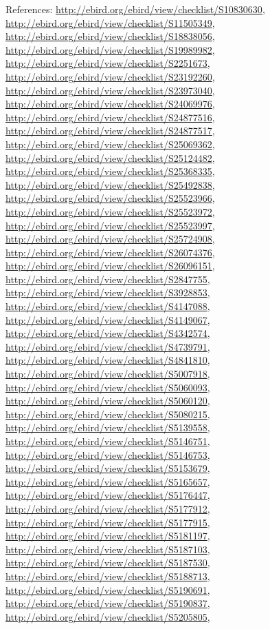 \documentclass[9pt, article]{memoir}
\begin{document}
\begin{multicols}{2}
\vspace{6pt}References: 
\url{http://ebird.org/ebird/view/checklist/S10830630}, 
\url{http://ebird.org/ebird/view/checklist/S11505349}, 
\url{http://ebird.org/ebird/view/checklist/S18838056}, 
\url{http://ebird.org/ebird/view/checklist/S19989982}, 
\url{http://ebird.org/ebird/view/checklist/S2251673}, 
\url{http://ebird.org/ebird/view/checklist/S23192260}, 
\url{http://ebird.org/ebird/view/checklist/S23973040}, 
\url{http://ebird.org/ebird/view/checklist/S24069976}, 
\url{http://ebird.org/ebird/view/checklist/S24877516}, 
\url{http://ebird.org/ebird/view/checklist/S24877517}, 
\url{http://ebird.org/ebird/view/checklist/S25069362}, 
\url{http://ebird.org/ebird/view/checklist/S25124482}, 
\url{http://ebird.org/ebird/view/checklist/S25368335}, 
\url{http://ebird.org/ebird/view/checklist/S25492838}, 
\url{http://ebird.org/ebird/view/checklist/S25523966}, 
\url{http://ebird.org/ebird/view/checklist/S25523972}, 
\url{http://ebird.org/ebird/view/checklist/S25523997}, 
\url{http://ebird.org/ebird/view/checklist/S25724908}, 
\url{http://ebird.org/ebird/view/checklist/S26074376}, 
\url{http://ebird.org/ebird/view/checklist/S26096151}, 
\url{http://ebird.org/ebird/view/checklist/S2847755}, 
\url{http://ebird.org/ebird/view/checklist/S3928853}, 
\url{http://ebird.org/ebird/view/checklist/S4147088}, 
\url{http://ebird.org/ebird/view/checklist/S4149067}, 
\url{http://ebird.org/ebird/view/checklist/S4342574}, 
\url{http://ebird.org/ebird/view/checklist/S4739791}, 
\url{http://ebird.org/ebird/view/checklist/S4841810}, 
\url{http://ebird.org/ebird/view/checklist/S5007918}, 
\url{http://ebird.org/ebird/view/checklist/S5060093}, 
\url{http://ebird.org/ebird/view/checklist/S5060120}, 
\url{http://ebird.org/ebird/view/checklist/S5080215}, 
\url{http://ebird.org/ebird/view/checklist/S5139558}, 
\url{http://ebird.org/ebird/view/checklist/S5146751}, 
\url{http://ebird.org/ebird/view/checklist/S5146753}, 
\url{http://ebird.org/ebird/view/checklist/S5153679}, 
\url{http://ebird.org/ebird/view/checklist/S5165657}, 
\url{http://ebird.org/ebird/view/checklist/S5176447}, 
\url{http://ebird.org/ebird/view/checklist/S5177912}, 
\url{http://ebird.org/ebird/view/checklist/S5177915}, 
\url{http://ebird.org/ebird/view/checklist/S5181197}, 
\url{http://ebird.org/ebird/view/checklist/S5187103}, 
\url{http://ebird.org/ebird/view/checklist/S5187530}, 
\url{http://ebird.org/ebird/view/checklist/S5188713}, 
\url{http://ebird.org/ebird/view/checklist/S5190691}, 
\url{http://ebird.org/ebird/view/checklist/S5190837}, 
\url{http://ebird.org/ebird/view/checklist/S5205805}, 

\end{multicols}
\end{document}
